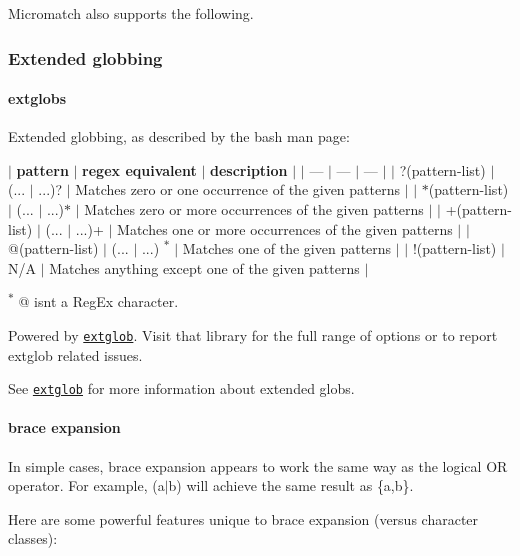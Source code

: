 Micromatch also supports the following.

\subsubsection*{Extended globbing}

\paragraph*{extglobs}

Extended globbing, as described by the bash man page\+:

$\vert$ {\bfseries pattern} $\vert$ {\bfseries regex equivalent} $\vert$ {\bfseries description} $\vert$ $\vert$ --- $\vert$ --- $\vert$ --- $\vert$ $\vert$ {\ttfamily ?(pattern-\/list)} $\vert$ {\ttfamily (... $\vert$ ...)?} $\vert$ Matches zero or one occurrence of the given patterns $\vert$ $\vert$ {\ttfamily $\ast$(pattern-\/list)} $\vert$ {\ttfamily (... $\vert$ ...)$\ast$} $\vert$ Matches zero or more occurrences of the given patterns $\vert$ $\vert$ {\ttfamily +(pattern-\/list)} $\vert$ {\ttfamily (... $\vert$ ...)+} $\vert$ Matches one or more occurrences of the given patterns $\vert$ $\vert$ {\ttfamily @(pattern-\/list)} $\vert$ {\ttfamily (... $\vert$ ...)} \textsuperscript{$\ast$} $\vert$ Matches one of the given patterns $\vert$ $\vert$ {\ttfamily !(pattern-\/list)} $\vert$ N/A $\vert$ Matches anything except one of the given patterns $\vert$

\textsuperscript{{\bfseries $\ast$}} {\ttfamily @} isn\textquotesingle{}t a Reg\+Ex character.

Powered by \href{https://github.com/jonschlinkert/extglob}{\tt extglob}. Visit that library for the full range of options or to report extglob related issues.

See \href{https://github.com/jonschlinkert/extglob}{\tt extglob} for more information about extended globs.

\paragraph*{brace expansion}

In simple cases, brace expansion appears to work the same way as the logical {\ttfamily OR} operator. For example, {\ttfamily (a$\vert$b)} will achieve the same result as {\ttfamily \{a,b\}}.

Here are some powerful features unique to brace expansion (versus character classes)\+:


